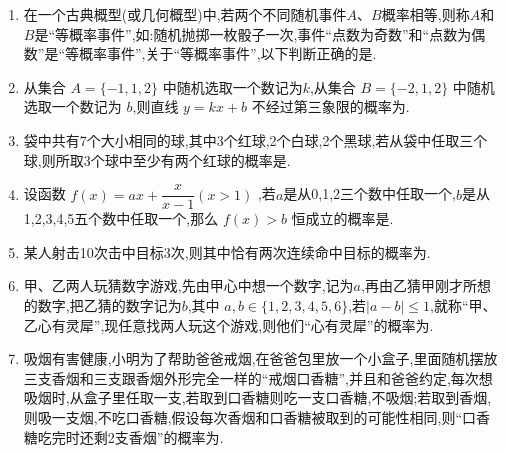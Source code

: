 \begin{enumerate}
\item 在一个古典概型(或几何概型)中,若两个不同随机事件$A$、$B$概率相等,则称$A$和$B$是“等概率事件”,如:随机抛掷一枚骰子一次,事件“点数为奇数”和“点数为偶数”是“等概率事件”,关于“等概率事件”,以下判断正确的是.

\item 从集合 $A=\{-1,1,2\}$ 中随机选取一个数记为$k$,从集合 $B=\{-2,1,2\}$ 中随机选取一个数记为 $b$,则直线 $y=kx+b$ 不经过第三象限的概率为.

\item 袋中共有7个大小相同的球,其中3个红球,2个白球,2个黑球,若从袋中任取三个球,则所取3个球中至少有两个红球的概率是.

\item 设函数 $f(x)=ax+\dfrac{x}{x-1}(x>1)$ ,若$a$是从0,1,2三个数中任取一个,$b$是从1,2,3,4,5五个数中任取一个,那么 $f(x)>b$ 恒成立的概率是.

\item 某人射击10次击中目标3次,则其中恰有两次连续命中目标的概率为.

\item 甲、乙两人玩猜数字游戏,先由甲心中想一个数字,记为$a$,再由乙猜甲刚才所想的数字,把乙猜的数字记为$b$,其中 $a,b\in\{1,2,3,4,5,6\}$,若$|a-b|\le1$,就称“甲、乙心有灵犀”,现任意找两人玩这个游戏,则他们“心有灵犀”的概率为.

\item 吸烟有害健康,小明为了帮助爸爸戒烟,在爸爸包里放一个小盒子,里面随机摆放三支香烟和三支跟香烟外形完全一样的“戒烟口香糖”,并且和爸爸约定,每次想吸烟时,从盒子里任取一支,若取到口香糖则吃一支口香糖,不吸烟;若取到香烟,则吸一支烟,不吃口香糖,假设每次香烟和口香糖被取到的可能性相同,则“口香糖吃完时还剩2支香烟”的概率为.


\end{enumerate}
